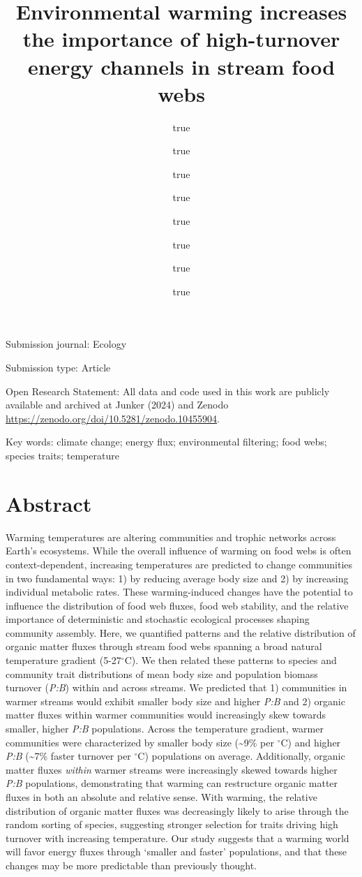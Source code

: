 \documentclass[
]{article}
\title{Environmental warming increases the importance of high-turnover
energy channels in stream food webs}
\author{true \and true \and true \and true \and true \and true \and true \and true}
\date{}
\numberwithin{equation}
\begin{document}
\maketitle

Submission journal: Ecology

Submission type: Article

Open Research Statement: All data and code used in this work are
publicly available and archived at Junker (2024) and Zenodo
\url{https://zenodo.org/doi/10.5281/zenodo.10455904}.

Key words: climate change; energy flux; environmental filtering; food
webs; species traits; temperature

\newpage

\hypertarget{abstract}{%
\section{Abstract}\label{abstract}}

Warming temperatures are altering communities and trophic networks
across Earth's ecosystems. While the overall influence of warming on
food webs is often context-dependent, increasing temperatures are
predicted to change communities in two fundamental ways: 1) by reducing
average body size and 2) by increasing individual metabolic rates. These
warming-induced changes have the potential to influence the distribution
of food web fluxes, food web stability, and the relative importance of
deterministic and stochastic ecological processes shaping community
assembly. Here, we quantified patterns and the relative distribution of
organic matter fluxes through stream food webs spanning a broad natural
temperature gradient (5-27\(^\circ\)C). We then related these patterns
to species and community trait distributions of mean body size and
population biomass turnover (\emph{P:B}) within and across streams. We
predicted that 1) communities in warmer streams would exhibit smaller
body size and higher \emph{P:B} and 2) organic matter fluxes within
warmer communities would increasingly skew towards smaller, higher
\emph{P:B} populations. Across the temperature gradient, warmer
communities were characterized by smaller body size (\textasciitilde9\%
per \(^\circ\)C) and higher \emph{P:B} (\textasciitilde7\% faster
turnover per \(^\circ\)C) populations on average. Additionally, organic
matter fluxes \emph{within} warmer streams were increasingly skewed
towards higher \emph{P:B} populations, demonstrating that warming can
restructure organic matter fluxes in both an absolute and relative
sense. With warming, the relative distribution of organic matter fluxes
was decreasingly likely to arise through the random sorting of species,
suggesting stronger selection for traits driving high turnover with
increasing temperature. Our study suggests that a warming world will
favor energy fluxes through `smaller and faster' populations, and that
these changes may be more predictable than previously thought.
\end{document}
